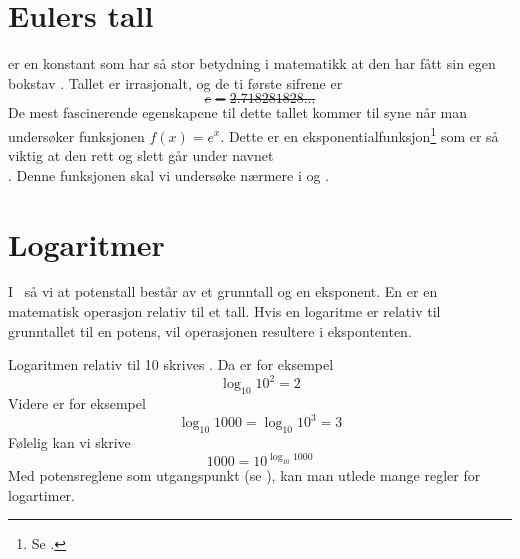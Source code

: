 \section{Eulers tall}
 er en konstant som har så stor betydning i matematikk at den har fått sin egen bokstav . Tallet er irrasjonalt, og de ti første sifrene er
\st{\[ e=2.718281828... \]}
De mest fascinerende egenskapene til dette tallet kommer til syne når man undersøker funksjonen ${f(x)= e^x} $. Dette er en eksponentialfunksjon\footnote{Se .} som er så viktig at den rett og slett går under navnet \\. Denne funksjonen skal vi undersøke nærmere i  og .
\section{Logaritmer}
I \mb\, så vi at potenstall består av et grunntall og en eksponent. En  er en matematisk operasjon relativ til et tall. Hvis en logaritme er relativ til grunntallet til en potens, vil operasjonen resultere i ekspontenten.\vsk

Logaritmen relativ til 10 skrives . Da er for eksempel
\[ \log_{10} 10^2 = 2 \]
Videre er for eksempel
\[ \log_{10} 1000= \log_{10} 10^3 = 3\]
Følelig kan vi skrive
\[ 1000 = 10^{\log_{10} 1000} \]
Med potensreglene som utgangspunkt (se \mb), kan man utlede mange regler for logartimer.\regv
{}
\eks[1]{ \vs
	\[ \log_5 5^9 = 9 \]
}
\eks[2]{ \vs
	\[ 3 = 8^{\log_8 3} \]
}
\newpage
{}


